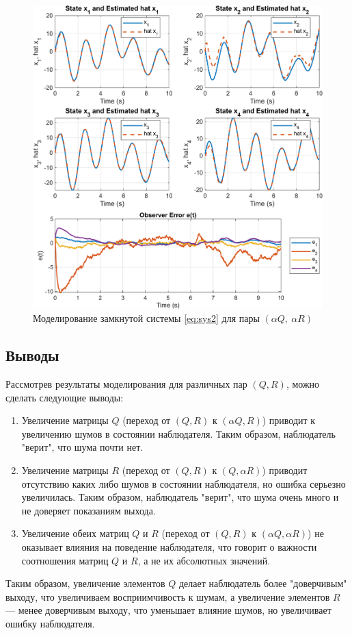 \begin{figure}[H]
    \centering
    \includegraphics[width=1\linewidth]{figs/2_sim4.png}
    \caption{Моделирование замкнутой системы \eqref{eq:sys2} для пары $(\alpha Q,\ \alpha  R )$}
    \label{fig:sys2sim4}
\end{figure}

\newpage\subsection{Выводы}

Рассмотрев результаты моделирования для различных пар $(Q, R)$, можно сделать 
следующие выводы:
\begin{enumerate}
    \item Увеличение матрицы $Q$ (переход от $(Q, R)$ к $(\alpha Q, R)$) 
    приводит к увеличению шумов в состоянии наблюдателя. Таким образом,
    наблюдатель "верит", что шума почти нет.
    \item Увеличение матрицы $R$ (переход от $(Q, R)$ к $(Q, \alpha R)$) 
    приводит отсутствию каких либо шумов в состоянии наблюдателя, но ошибка
    серьезно увеличилась. Таким образом, наблюдатель "верит", что шума очень много и 
    не доверяет показаниям выхода.
    \item Увеличение обеих матриц $Q$ и $R$ (переход от $(Q, R)$ к $(\alpha Q, \alpha R)$) 
    не оказывает влияния на поведение наблюдателя, 
    что говорит о важности соотношения матриц $Q$ и $R$, а не их абсолютных значений.
\end{enumerate}
Таким образом, увеличение элементов $Q$ делает наблюдатель более 
"доверчивым" выходу, что увеличиваем восприимчивость к шумам, 
а увеличение элементов $R$ — менее доверчивым выходу, что уменьшает влияние шумов,
но увеличивает ошибку наблюдателя.





